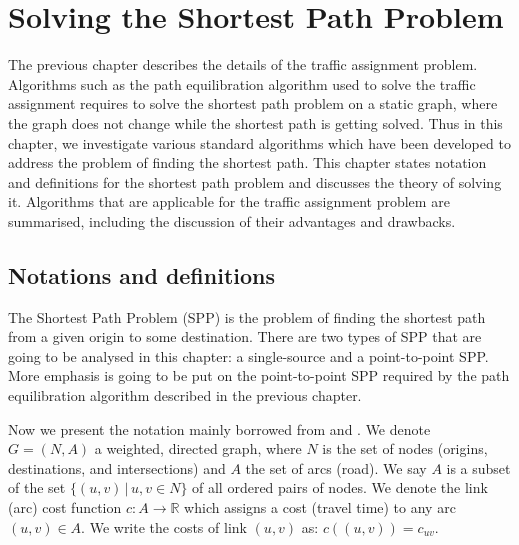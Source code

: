 \chapter{Solving the Shortest Path Problem} \label{chap:solvingspp}

The previous chapter describes the details of the traffic assignment problem.
Algorithms such as the path equilibration algorithm used to solve the traffic assignment requires to solve the shortest path problem on a static graph, where the graph does not change while the shortest path is getting solved.
Thus in this chapter, we investigate 
various standard algorithms which have been developed 
to address the problem of finding the shortest path.
This chapter states notation and definitions for the shortest path problem and discusses
the theory of solving it.
Algorithms that are applicable for the traffic assignment problem are summarised,
including the discussion of their advantages and drawbacks.

\section{Notations and definitions}
The Shortest Path Problem (SPP) is the problem of finding the shortest path from a given origin  to some destination.
There are two types of SPP that are going to
be analysed in this chapter:
a single-source and a point-to-point SPP.  
More emphasis is going to be put on the point-to-point SPP required by the path equilibration algorithm described in the previous chapter.


Now we present the notation mainly borrowed from \citet{Cormen} and \citet{Klunder}.
We denote $ G = ( N, A ) $ a weighted, directed graph,
where $ N $ is the set of nodes (origins, destinations, and intersections)
and $ A $ the set of arcs (road).
We say $ A $ is a subset of the set $ \{ (u, v)\, | \, u, v \in N \} $ of all ordered pairs of nodes.
We denote the link (arc) cost function $ c : A \rightarrow \mathbb{R} $ which assigns a cost (travel time) to any arc $ (u,v) \in A $.
We write the costs of link $(u, v)$ as: $ c((u, v)) = c_{uv} $.

